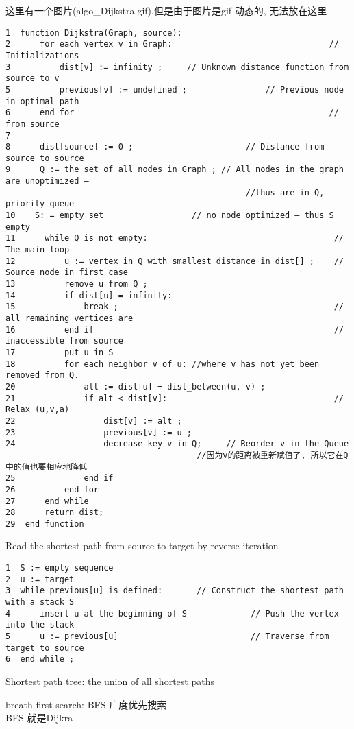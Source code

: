 \documentclass{article}
\begin{document}
这里有一个图片(algo\_Dijkstra.gif),但是由于图片是gif 动态的, 无法放在这里
\begin{verbatim}
1  function Dijkstra(Graph, source):
2      for each vertex v in Graph:                                // Initializations
3          dist[v] := infinity ;     // Unknown distance function from source to v
5          previous[v] := undefined ;                // Previous node in optimal path
6      end for                                                    // from source
7
8      dist[source] := 0 ;                       // Distance from source to source
9      Q := the set of all nodes in Graph ; // All nodes in the graph are unoptimized –
                                                 //thus are in Q, priority queue
10    S: = empty set                  // no node optimized – thus S empty
11      while Q is not empty:                                      // The main loop
12          u := vertex in Q with smallest distance in dist[] ;    // Source node in first case
13          remove u from Q ;
14          if dist[u] = infinity:
15              break ;                                            // all remaining vertices are
16          end if                                                 // inaccessible from source
17          put u in S
18          for each neighbor v of u: //where v has not yet been removed from Q.
20              alt := dist[u] + dist_between(u, v) ;
21              if alt < dist[v]:                                  // Relax (u,v,a)
22                  dist[v] := alt ;
23                  previous[v] := u ;
24                  decrease-key v in Q;     // Reorder v in the Queue
                                       //因为v的距离被重新赋值了, 所以它在Q中的值也要相应地降低
25              end if
26          end for
27      end while
28      return dist;
29  end function
\end{verbatim}

Read the shortest path from source to target by reverse iteration
\begin{verbatim}
1  S := empty sequence
2  u := target
3  while previous[u] is defined:       // Construct the shortest path with a stack S
4      insert u at the beginning of S             // Push the vertex into the stack
5      u := previous[u]                           // Traverse from target to source
6  end while ;
\end{verbatim}

\noindent
Shortest path tree: the union of all shortest paths

breath first search: BFS 广度优先搜索\\
BFS 就是Dijkra\\
\end{document}
